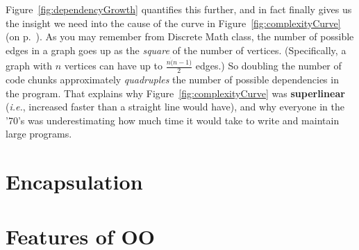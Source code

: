 Figure~\ref{fig:dependencyGrowth} quantifies this further, and in fact finally
gives us the insight we need into the cause of the curve in
Figure~\ref{fig:complexityCurve} (on p.~\pageref{fig:complexityCurve}). As you
may remember from Discrete Math class, the number of possible edges in a graph
goes up as the \textit{square} of the number of vertices. (Specifically, a
graph with $n$ vertices can have up to $\frac{n\dot(n-1)}{2}$ edges.) So
doubling the number of code chunks approximately \textit{quadruples} the
number of possible dependencies in the program. That explains why
Figure~\ref{fig:complexityCurve} was \textbf{superlinear} (\textit{i.e.},
increased faster than a straight line would have), and why everyone in the
'70's was underestimating how much time it would take to write and maintain
large programs.

\section{Encapsulation}

\section{Features of OO}

% 
% 
% 
